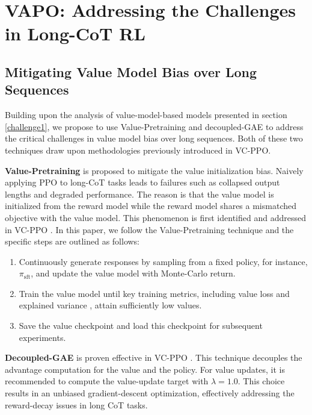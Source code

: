 \section{VAPO: Addressing the Challenges in Long-CoT RL}

\subsection{Mitigating Value Model Bias over Long Sequences}
Building upon the analysis of value-model-based models presented in section \ref{challenge1}, we propose to use Value-Pretraining and decoupled-GAE to address the critical challenges in value model bias over long sequences. 
Both of these two techniques draw upon methodologies previously introduced in VC-PPO.

\textbf{Value-Pretraining} is proposed to mitigate the value initialization bias. Naively applying PPO to long-CoT tasks leads to failures such as collapsed output lengths and degraded performance. The reason is that the value model is initialized from the reward model while the reward model shares a mismatched objective with the value model. This phenomenon is first identified and addressed in VC-PPO \citep{vc-ppo}. In this paper, we follow the Value-Pretraining technique and the specific steps are outlined as follows:

\begin{enumerate}[leftmargin=*]
    \item Continuously generate responses by sampling from a fixed policy, for instance, $\pi_{\text{sft}}$, and update the value model with Monte-Carlo return.
    \item Train the value model until key training metrics, including value loss and explained variance \citep{explained_variance}, attain sufficiently low values.
    \item Save the value checkpoint and load this checkpoint for subsequent experiments. 
\end{enumerate}

\textbf{Decoupled-GAE} is proven effective in VC-PPO \citep{vc-ppo}. This technique decouples the advantage computation for the value and the policy. For value updates, it is recommended to compute the value-update target with $\lambda = 1.0$. This choice results in an unbiased gradient-descent optimization, effectively addressing the reward-decay issues in long CoT tasks.

